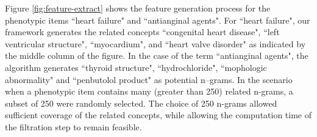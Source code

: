 \documentclass{sig-alternate-05-2015}
\newcommand{\kibitz}[2]{\ifnum\Comments=1\textcolor{#1}{#2}\fi}
\newcommand{\joyce}[1]{\kibitz{purple}      {[Joyce: #1]}}
\newcommand{\jette}[1]{\kibitz{red}      {[Jette: #1]}}
\begin{document}
Figure \ref{fig:feature-extract} shows the feature generation process for the phenotypic items ``heart failure" and ``antianginal agents".
For ``heart failure", our framework generates the related concepts ``congenital heart disease", ``left ventricular structure", ``myocardium", and ``heart valve disorder" as indicated by the middle column of the figure.
In the case of the term ``antianginal agents", the algorithm generates ``thyroid structure", ``hydrochloride", ``mophologic abnormality" and ``penbutolol product" as potential n--grams.
In the scenario when a phenotypic item contains many (greater than 250) related n-grams, a subset of 250 were randomly selected.
The choice of 250 n-grams allowed sufficient coverage of the related concepts, while allowing the computation time of the filtration step to remain feasible.


\end{document}
